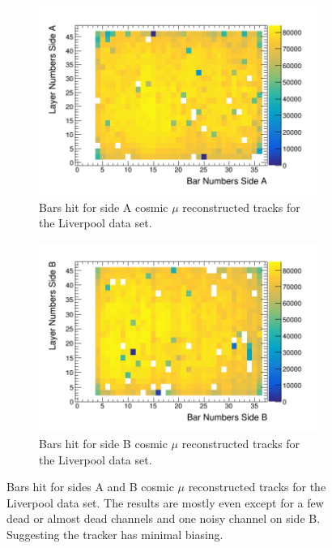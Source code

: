 \begin{figure}[htbp]
\centering
\begin{subfigure}{.5\textwidth}
  \centering
  \includegraphics[width=\linewidth]{Chapter5/Figs/wylfaRasterNew/liverpoolSideAHits.png}
  \captionsetup{width=.9\linewidth}
  \caption{Bars hit for side A cosmic $\mu$ reconstructed tracks for the Liverpool data set.}
  \label{subFig:liverpoolSideAHits}
\end{subfigure}%
\begin{subfigure}{.5\textwidth}
  \centering
\includegraphics[width=\linewidth]{Chapter5/Figs/wylfaRasterNew/liverpoolSideBHits.png}
  \captionsetup{width=.9\linewidth}
  \caption{Bars hit for side B cosmic $\mu$ reconstructed tracks for the Liverpool data set.}
  \label{subFig:liverpoolSideBHits}
\end{subfigure}
\caption{Bars hit for sides A and B cosmic $\mu$ reconstructed tracks for the Liverpool data set. The results are mostly even except for a few dead or almost dead channels and one noisy channel on side B. Suggesting the tracker has minimal biasing.}
\label{fig:liverpoolSideABHits}
\end{figure}

